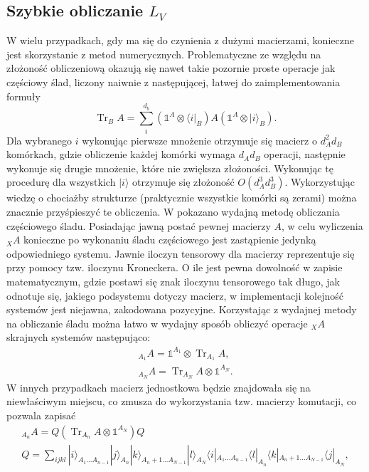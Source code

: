 \documentclass[10pt]{article} %
\DeclareMathOperator{\Trs}{Tr}
\newcommand{\Ket}[1]{|#1\rangle}
\newcommand{\Bra}[1]{\langle#1|}
\newcommand{\I}{\mathbb{1}}
\begin{document}


\begin{appendices}
\section{Szybkie obliczanie $L_V$}
W wielu przypadkach, gdy ma się do czynienia z dużymi macierzami, konieczne jest skorzystanie z metod numerycznych. Problematyczne ze względu na złożoność obliczeniową okazują się nawet takie pozornie proste operacje jak częściowy ślad, liczony naiwnie z następującej, łatwej do zaimplementowania formuły
\begin{equation}
\Trs_B A = \sum^{d_b}_i (\I^A \otimes \Bra{i}_B)A(\I^A \otimes \Ket{i}_B).
\end{equation} Dla wybranego $i$ wykonując pierwsze mnożenie otrzymuje się macierz o $d_A^2d_B$ komórkach, gdzie obliczenie każdej komórki wymaga $d_Ad_B$ operacji, następnie wykonuje się drugie mnożenie, które nie zwiększa złożoności. Wykonując tę procedurę dla wszystkich $\Ket{i}$ otrzymuje się złożoność $O(d_A^3d_B^3)$. Wykorzystując wiedzę o chociażby strukturze (praktycznie wszystkie komórki są zerami) można znacznie przyśpieszyć te obliczenia.
W \cite{partial_trace} pokazano wydajną metodę obliczania częściowego śladu. Posiadając jawną postać pewnej macierzy $A$, w celu wyliczenia ${}_XA$ konieczne po wykonaniu śladu częściowego jest zastąpienie jedynką odpowiedniego systemu. Jawnie iloczyn tensorowy dla macierzy reprezentuje się przy pomocy tzw. iloczynu Kroneckera. O ile jest pewna dowolność w zapisie matematycznym, gdzie postawi się znak iloczynu tensorowego tak długo, jak odnotuje się, jakiego podsystemu dotyczy macierz, w implementacji kolejność systemów jest niejawna, zakodowana pozycyjne. Korzystając z wydajnej metody na obliczanie śladu
można łatwo w wydajny sposób obliczyć operacje ${}_XA$ skrajnych systemów następująco:
\begin{gather}
{}_{A_1}A= \I^{A_1} \otimes \Trs_{A_1} A,\\
{}_{A_ N}A = \Trs_{A_N} A \otimes \I^{A_N}.
\end{gather}
W innych przypadkach macierz jednostkowa będzie znajdowała się na niewłaściwym miejscu, co zmusza do wykorzystania tzw. macierzy komutacji, co pozwala zapisać
\begin{gather}
{}_{A_n}A = Q\left( \Trs_{A_n}A \otimes \I^{A_N} \right)Q \\
Q = \sum_{ijkl} \Ket{i}_{A_1 \dots A_{n-1}} \Ket{j}_{A_n} \Ket{k}_{A_n+1 \dots A_{N-1}} \Ket{l}_{A_N}\Bra{i}_{A_1 \dots A_{n-1}} \Bra{l}_{A_n} \Bra{k}_{A_n+1 \dots A_{N-1}} \Bra{j}_{A_N},

\end{gather}
\end{appendices}
\end{document}
